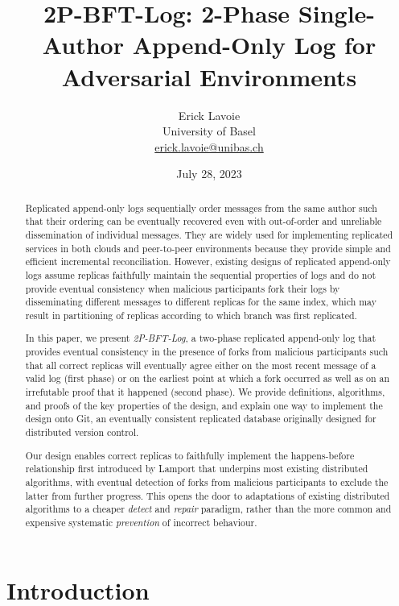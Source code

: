 \documentclass[9pt, oneside]{article}   	%
\title{2P-BFT-Log: 2-Phase Single-Author Append-Only Log for Adversarial Environments}
\author{Erick Lavoie \\
University of Basel \\
\href{mailto:erick.lavoie@unibas.ch}{erick.lavoie@unibas.ch}}
\date{July 28, 2023}							%
\begin{document}
\maketitle


\begin{abstract}
Replicated append-only logs sequentially order messages from the same author such that their ordering can be eventually recovered even with out-of-order and unreliable dissemination of individual messages. They are widely used for implementing replicated services in both clouds and peer-to-peer environments because they provide simple and efficient incremental reconciliation. However, existing designs of replicated append-only logs assume replicas faithfully maintain the sequential properties of logs and do not provide eventual consistency when malicious participants fork their logs by disseminating different messages to different replicas for the same index, which may result in partitioning of replicas according to which branch was first replicated.
 
In this paper, we present \textit{2P-BFT-Log}, a two-phase replicated append-only log that provides eventual consistency in the presence of forks from malicious participants such that all correct replicas will eventually agree either on the most recent message of a valid log (first phase) or on the earliest point at which a fork occurred as well as on an irrefutable proof that it happened (second phase). We provide definitions, algorithms, and proofs of the key properties of the design, and explain one way to implement the design onto Git, an eventually consistent replicated database originally designed for distributed version control.

Our design enables correct replicas to faithfully implement the happens-before relationship first introduced by Lamport that underpins most existing distributed algorithms, with eventual detection of forks from malicious participants to exclude the latter from further progress. This opens the door to adaptations of existing distributed algorithms to a cheaper \textit{detect} and \textit{repair} paradigm, rather than the more common and expensive systematic \textit{prevention} of incorrect behaviour.
\end{abstract}

\section{Introduction}
\label{sec:introduction}
\end{document}
